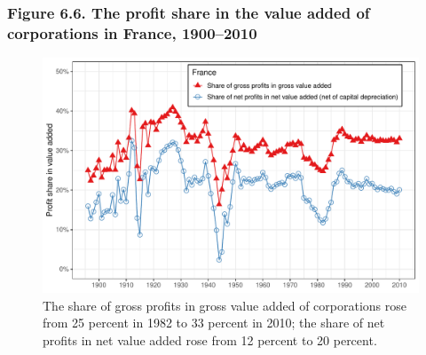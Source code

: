 \documentclass[t]{beamer}\usepackage[]{graphicx}\usepackage[]{color}
\newenvironment{knitrout}{}{} %
\begin{document}
\begin{frame}[label=Figure_6_6]
\frametitle{Figure 6.6. The profit share in the value added of corporations in France, 1900--2010}
\begin{figure}[t]
\begin{minipage}[b]{\textwidth}
\centering
\begin{knitrout}\footnotesize
{}\color{fgcolor}

{\centering \includegraphics[width=1\linewidth]{figures/color/Figure_6_6} 

}



\end{knitrout}
\caption{The share of gross profits in gross value added of corporations rose from 25 percent in 1982 to 33 percent in 2010; the share of net profits in net value added rose from 12 percent to 20 percent.}
\end{minipage}
\end{figure}
\end{frame}
\end{document}
